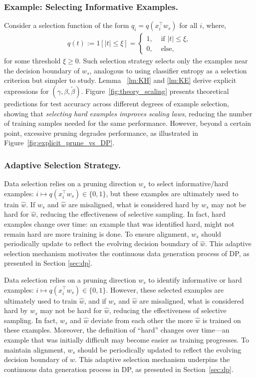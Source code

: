 \subsubsection{Example: Selecting Informative Examples.}

Consider a selection function of the form $q_i = q(x_i^\top w_s)$ for all $i$, where,
\begin{eqnarray}
q(t) := 1[|t| \le \xi] =  \begin{cases}
    1,&\mbox{ if }|t| \le \xi,\\
    0,&\mbox{ else,}
    \end{cases}
\end{eqnarray}
for some threshold $\xi \ge 0$. Such selection strategy selects only the examples near the decision boundary of $w_s$, analogous to using classifier entropy as a selection criterion but simpler to study. Lemma ~\ref{lm:KH} and \ref{lm:KE} derive explicit expressions for $(\gamma,\beta,\tilde\beta)$. 
Figure~\ref{fig:theory_scaling} presents theoretical predictions for test accuracy across different degrees of example selection, showing that \textit{selecting hard examples improves scaling laws}, reducing the number of training samples needed for the same performance. However, beyond a certain point, excessive pruning degrades performance, as illustrated in Figure~\ref{fig:explicit_prune_vs_DP}.

\subsubsection{Adaptive Selection Strategy.}  
Data selection relies on a pruning direction \( w_s \) to select informative/hard examples: $i \mapsto q(x_i^\top w_s) \in \{0,1\}$, but these examples are ultimately used to train \( \hat{w} \). If \( w_s \) and \( \hat{w} \) are misaligned, what is considered hard by \( w_s \) may not be hard for \( \hat{w} \), reducing the effectiveness of selective sampling. In fact, hard examples change over time: an example that was identified hard, might not remain hard are more training is done. To ensure alignment, \( w_s \) should periodically update to reflect the evolving decision boundary of \( \hat{w} \). This adaptive selection mechanism motivates the continuous data generation process of DP, as presented in Section \ref{sec:dp}.

Data selection relies on a pruning direction \( w_s \) to identify informative or hard examples: \( i \mapsto q(x_i^\top w_s) \in \{0,1\} \). However, these selected examples are ultimately used to train \( \hat{w} \), and if \( w_s \) and \( \hat{w} \) are misaligned, what is considered hard by \( w_s \) may not be hard for \( \hat{w} \), reducing the effectiveness of selective sampling. In fact, \( w_s \) and \( \hat{w} \) deviate from each other the more \( \hat{w} \) is trained on these examples. Moreover, the definition of ``hard'' changes over time—an example that was initially difficult may become easier as training progresses. To maintain alignment, \( w_s \) should be periodically updated to reflect the evolving decision boundary of \( \hat{w} \). This adaptive selection mechanism underpins the continuous data generation process in DP, as presented in Section~\ref{sec:dp}.
